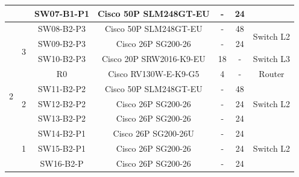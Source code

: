 \documentclass{article}
\begin{document}
\begin{table}[H]
\begin{tabular}{|c|c|c|c|c|c|c|}
		&                    & SW07-B1-P1                      & Cisco 50P SLM248GT-EU                      & -                      & 24                      &                            \\ \hline
		\multirow{10}{*}{2} & \multirow{4}{*}{3} & SW08-B2-P3                      & Cisco 50P SLM248GT-EU                      & -                      & 48                      & \multirow{2}{*}{Switch L2} \\ \cline{3-6}
		&                    & SW09-B2-P3                      & Cisco 26P SG200-26                      	& -                      & 24                      &                            \\ \cline{3-7} 
		&                    & SW10-B2-P3                      & Cisco 20P SRW2016-K9-EU                    & 18                     & -                       & Switch L3                  \\ \cline{3-7} 
		&                    & R0                              & Cisco RV130W-E-K9-G5                       & 4                      & -                       & Router                     \\ \cline{2-7} 
		& \multirow{3}{*}{2} & SW11-B2-P2                      & Cisco 50P SLM248GT-EU                      & -                      & 48                      & \multirow{3}{*}{Switch L2} \\ \cline{3-6}
		&                    & SW12-B2-P2                      & Cisco 26P SG200-26                      	& -                      & 24                      &                            \\ \cline{3-6}
		&                    & SW13-B2-P2                      & Cisco 26P SG200-26                      	& -                      & 24                      &                            \\ \cline{2-7} 
		& \multirow{3}{*}{1} & SW14-B2-P1                      & Cisco 26P SG200-26U                      	& -                      & 24                      & \multirow{3}{*}{Switch L2} \\ \cline{3-6}
		&                    & SW15-B2-P1 						& Cisco 26P SG200-26 						& - & 24 &                            \\ \cline{3-6}
		&                    & SW16-B2-P   						& Cisco 26P SG200-26 & - & 24 &                            \\ \hline
	\end{tabular}
\end{table}
\end{document}
